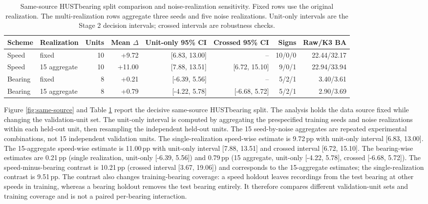 \documentclass[11pt]{article}
\newcommand{\SI}[2]{#1\,\ensuremath{#2}}
\newcommand{\pp}{\mathrm{pp}}
\begin{document}
\begin{table}[t]
\centering
\caption{Same-source HUSTbearing split comparison and noise-realization
sensitivity. Fixed rows use the original realization. The multi-realization
rows aggregate three seeds and five noise realizations. Unit-only intervals
are the Stage 2 decision intervals; crossed intervals are robustness checks.}
\label{tab:same-source}
\scriptsize
\begin{tabular}{@{}llrrrrrr@{}}
\toprule
Scheme & Realization & Units & Mean $\Delta$ & Unit-only 95\% CI & Crossed 95\% CI & Signs & Raw/K3 BA \\
\midrule
Speed & fixed & 10 & +9.72 & [6.83, 13.00] & -- & 10/0/0 & 22.44/32.17 \\
Speed & 15 aggregate & 10 & +11.00 & [7.88, 13.51] & [6.72, 15.10] & 9/0/1 & 22.94/33.94 \\
Bearing & fixed & 8 & +0.21 & [-6.39, 5.56] & -- & 5/2/1 & 3.40/3.61 \\
Bearing & 15 aggregate & 8 & +0.79 & [-4.22, 5.78] & [-6.68, 5.72] & 5/2/1 & 2.90/3.69 \\
\bottomrule
\end{tabular}
\end{table}

Figure \ref{fig:same-source} and Table \ref{tab:same-source} report the
decisive same-source HUSTbearing split. The analysis holds the data
source fixed while changing the validation-unit set. The unit-only interval is
computed by aggregating the prespecified training seeds and noise realizations
within each held-out unit, then resampling the independent held-out units. The
15 seed-by-noise aggregates are repeated experimental combinations, not 15
independent validation units. The single-realization speed-wise estimate is
\SI{9.72}{\pp} with unit-only interval [6.83, 13.00]. The 15-aggregate
speed-wise estimate is \SI{11.00}{\pp} with unit-only interval
[7.88, 13.51] and crossed interval [6.72, 15.10]. The bearing-wise estimates
are \SI{0.21}{\pp} (single realization, unit-only [-6.39, 5.56]) and
\SI{0.79}{\pp} (15 aggregate, unit-only [-4.22, 5.78], crossed
[-6.68, 5.72]). The speed-minus-bearing contrast is \SI{10.21}{\pp}
(crossed interval [3.67, 19.06]) and corresponds to the 15-aggregate
estimates; the single-realization contrast is \SI{9.51}{\pp}. The contrast
also changes training-bearing coverage: a speed holdout leaves recordings from
the test bearing at other speeds in training, whereas a bearing holdout removes
the test bearing entirely. It therefore compares different validation-unit
sets and training coverage and is not a paired per-bearing interaction.
\end{document}
